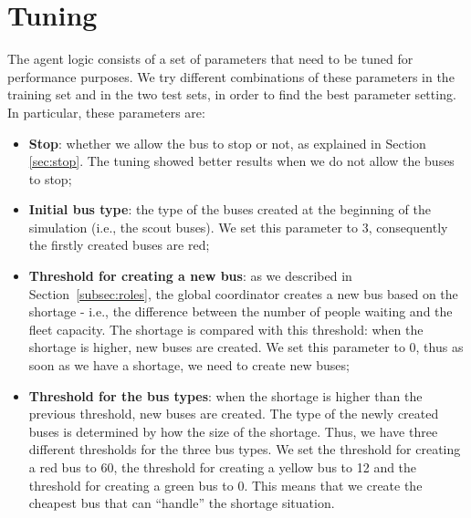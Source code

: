 \section{Tuning}
\label{sec:tuning}

The agent logic consists of a set of parameters that need to be tuned for performance purposes. We try different combinations of these parameters in the training set and in the two test sets, in order to find the best parameter setting. In particular, these parameters are:

\begin{itemize}
\item \textbf{Stop}: whether we allow the bus to stop or not, as explained in Section \ref{sec:stop}. The tuning showed better results when we do not allow the buses to stop;
\item \textbf{Initial bus type}: the type of the buses created at the beginning of the simulation (i.e., the scout buses). We set this parameter to 3, consequently the firstly created buses are red;
\item \textbf{Threshold for creating a new bus}: as we described in Section~\ref{subsec:roles}, the global coordinator creates a new bus based on the shortage - i.e., the difference between the number of people waiting and the fleet capacity. The shortage is compared with this threshold: when the shortage is higher, new buses are created. We set this parameter to 0, thus as soon as we have a shortage, we need to create new buses;
\item \textbf{Threshold for the bus types}: when the shortage is higher than the previous threshold, new buses are created. The type of the newly created buses is determined by how the size of the shortage. Thus, we have three different thresholds for the three bus types. We set the threshold for creating a red bus to 60, the threshold for creating a yellow bus to 12 and the threshold for creating a green bus to 0. This means that we create the cheapest bus that can ``handle'' the shortage situation. 
\end{itemize}
